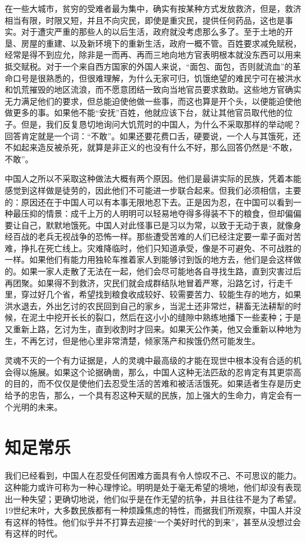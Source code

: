 \documentclass[12pt,oneside]{book}
\begin{document}
\begin{common-format}
在一些大城市，贫穷的受难者最为集中，确实有按某种方式发放救济，但是，救济相当有限，时限又短，并且不向灾民，即使是重灾民，提供任何药品，这也是事实。对于遭灾严重的那些人的以后生活，政府就没考虑那么多了。至于土地的开垦、房屋的重建、以及新环境下的重新生活，政府一概不管。百姓要求减免赋税，经常是得不到应允，除非是一而再、再而三地向地方官表明根本就没东西可以用来抵交赋税。对于一个来自西方国家的外国人来说，“面包、面包，否则就流血”的革命口号是很熟悉的，但很难理解，为什么无家可归，饥饿绝望的难民宁可在被洪水和饥荒摧毁的地区流浪，而不愿意团结一致向当地官员要求救助。这些地方官确实无力满足他们的要求，但总能迫使他做一些事，而这也算是开个头，以便能迫使他做更多的事。如果他不能“安抚”百姓，他就应该下台，就让其他官员取代他的位子。但是，我们反复恳切地询问大饥荒时的中国人，为什么不采取那样的举动呢？回答肯定就是一个词：“不敢”。如果还要花费口舌，硬要说，一个人与其饿死，还不如起来造反被杀死，就算是非正义的也没有什么不好，那么回答仍然是“不敢，不敢”。 

中国人之所以不采取这种做法大概有两个原因。他们是最讲实际的民族，凭着本能感觉到这样做是徒劳的，因此他们不可能进一步联合起来。但我们必须相信，主要的：原因还在于中国人可以有本事无限地忍下去。正是因为忍，在中国可以看到一种最压抑的情景：成千上万的人明明可以轻易地夺得多得装不下的粮食，但却偏偏要让自己，默默地饿死。中国人对此怪事已是习以为常，以致于无动于衷，就像身经百战的老兵无视战争的恐怖一样。那些遭受苦难的人们已经注定要一辈子面对苦难，挣扎在死亡线上。灾难降临时，他们只知道承受，像是不可避免、不可战胜的一样。如果他们有能力用独轮车推着家人到能够讨到饭的地方去，他们是会这样做的。如果一家人走散了无法在一起，他们会尽可能地各自寻找生路，直到灾害过后再团聚。如果得不到救济，灾民们就会成群结队地冒着严寒，沿路乞讨，行走千里，穿过好几个省，希望找到粮食收成较好、较需要苦力、较能生存的地方，如果洪水退去，外出乞讨的农民回到自己的家乡，当泥土还非常烂，耕畜无法耕犁的时候，在泥土中挖开长长的裂口，然后在这小小的缝隙中熟练地播下一些麦种；于是又重新上路，乞讨为生，直到收割时才回来。如果天公作美，他又会重新以种地为生，不再乞讨，但是他心里非常清楚，倾家荡产和挨饿仍然可能发生。 

灵魂不灭的一个有力证据是，人的灵魂中最高级的才能在现世中根本没有合适的机会得以施展。如果这个论据确凿，那么，中国人这种无法匹敌的忍肯定有其更崇高的目的，而不仅仅是使他们去忍受生活的苦难和被活活饿死。如果适者生存是历史给予的忠告，那么，一个具有忍这种天赋的民族，加上强大的生命力，肯定会有一个光明的未来。

\chapter{知足常乐}
我们已经看到，中国人在忍受任何困难方面具有令人惊叹不己、不可思议的能力。这种能力或许可称为一种心理悖论。明明是处于毫无希望的境地，他们却没有表现出一种失望；更确切地说，他们似乎是在作无望的抗争，并且往往不是为了希望。19世纪末叶，大多数民族都有一种烦躁焦虑的特性，而据我们所观察，中国人并没有这样的特性。他们似乎并不打算去迎接“一个美好时代的到来”，甚至从没想过会有这样的时代。 


\end{common-format}
\end{document}
